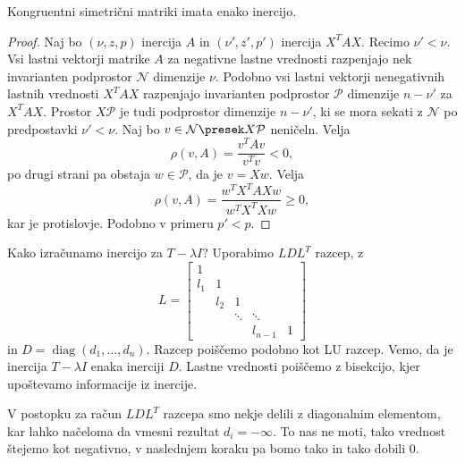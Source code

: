 \begin{izrek}[Sylvester]
  Kongruentni simetrični matriki imata enako inercijo.
\end{izrek}

\begin{proof}
  Naj bo $(\nu, z, p)$ inercija $A$ in $(\nu', z', p')$ inercija $X^T A X$.
  Recimo $\nu' < \nu$.
  Vsi lastni vektorji matrike $A$ za negativne lastne vrednosti razpenjajo nek
  invarianten podprostor $\mathcal{N}$ dimenzije $\nu$.
  Podobno vsi lastni vektorji nenegativnih lastnih vrednosti $X^T A X$
  razpenjajo invarianten podprostor $\mathcal{P}$ dimenzije $n - \nu'$ za $X^T A
  X$.
  Prostor $X \mathcal{P}$ je tudi podprostor dimenzije $n - \nu'$, ki se mora
  sekati z $\mathcal{N}$ po predpostavki $\nu' < \nu$.
  Naj bo $v \in \mathcal{N} \presek X \mathcal{P}$ neničeln.
  Velja
  \[
	\rho(v, A) = \frac{v^T A v}{v^T v} < 0,
  \]
  po drugi strani pa obstaja $w \in \mathcal{P}$, da je $v = X w$.
  Velja
  \[
	\rho(v, A) = \frac{w^T X^T A X w}{w^T X^T X w} \ge 0,
  \]
  kar je protislovje.
  Podobno v primeru $p' < p$.
\end{proof}


Kako izračunamo inercijo za $T - \lambda I$?
Uporabimo $L D L^T$ razcep, z
\[
  L =
  \begin{bmatrix}
	1 & & & & \\
	l_1 & 1 & & & \\
	  & l_2 & 1 & & \\
	  & & \ddots & \ddots & \\
	& & & l_{n-1} & 1
  \end{bmatrix}
\]
in $D = \operatorname{diag}(d_1, \ldots, d_n)$.
Razcep poiščemo podobno kot LU razcep.
Vemo, da je inercija $T - \lambda I$ enaka inerciji $D$.
Lastne vrednosti poiščemo z bisekcijo, kjer upoštevamo informacije iz inercije.

V postopku za račun $LDL^T$ razcepa smo nekje delili z diagonalnim elementom,
kar lahko načeloma da vmesni rezultat $d_i = -\infty$.
To nas ne moti, tako vrednost štejemo kot negativno, v naslednjem koraku pa bomo
tako in tako dobili $0$.



